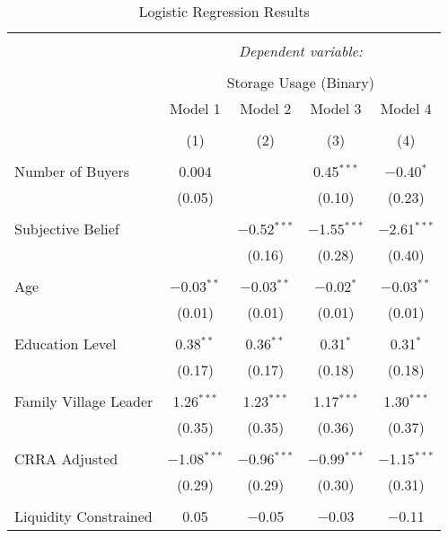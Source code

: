 
\begin{table}[!htbp] \centering 
  \caption{Logistic Regression Results} 
  \label{tab: binary storage ~ buyers' competition at harvest} 
\footnotesize 
\begin{tabular}{@{\extracolsep{5pt}}lcccc} 
\\[-1.8ex]\hline 
\hline \\[-1.8ex] 
 & \multicolumn{4}{c}{\textit{Dependent variable:}} \\ 
\cline{2-5} 
\\[-1.8ex] & \multicolumn{4}{c}{Storage Usage (Binary)} \\ 
 & Model 1 & Model 2 & Model 3 & Model 4 \\ 
\\[-1.8ex] & (1) & (2) & (3) & (4)\\ 
\hline \\[-1.8ex] 
 Number of Buyers & 0.004 &  & 0.45$^{***}$ & $-$0.40$^{*}$ \\ 
  & (0.05) &  & (0.10) & (0.23) \\ 
  & & & & \\ 
 Subjective Belief &  & $-$0.52$^{***}$ & $-$1.55$^{***}$ & $-$2.61$^{***}$ \\ 
  &  & (0.16) & (0.28) & (0.40) \\ 
  & & & & \\ 
 Age & $-$0.03$^{**}$ & $-$0.03$^{**}$ & $-$0.02$^{*}$ & $-$0.03$^{**}$ \\ 
  & (0.01) & (0.01) & (0.01) & (0.01) \\ 
  & & & & \\ 
 Education Level & 0.38$^{**}$ & 0.36$^{**}$ & 0.31$^{*}$ & 0.31$^{*}$ \\ 
  & (0.17) & (0.17) & (0.18) & (0.18) \\ 
  & & & & \\ 
 Family Village Leader & 1.26$^{***}$ & 1.23$^{***}$ & 1.17$^{***}$ & 1.30$^{***}$ \\ 
  & (0.35) & (0.35) & (0.36) & (0.37) \\ 
  & & & & \\ 
 CRRA Adjusted & $-$1.08$^{***}$ & $-$0.96$^{***}$ & $-$0.99$^{***}$ & $-$1.15$^{***}$ \\ 
  & (0.29) & (0.29) & (0.30) & (0.31) \\ 
  & & & & \\ 
 Liquidity Constrained & 0.05 & $-$0.05 & $-$0.03 & $-$0.11 \\ 

\end{tabular}
\end{table}

